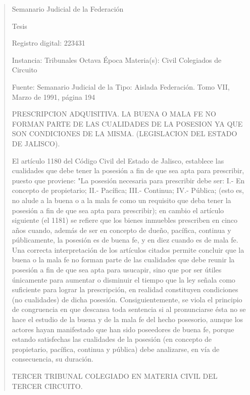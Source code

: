 \documentclass[11pt,a4paper]{article}
\begin{document}
\begin{quote}
                                                   Semanario Judicial de la Federación

                                                  Tesis

 Registro digital: 223431

 Instancia: Tribunales              Octava Época                            Materia(s): Civil
 Colegiados de Circuito

                                    Fuente: Semanario Judicial de la        Tipo: Aislada
                                    Federación.
                                    Tomo VII, Marzo de 1991, página
                                    194


PRESCRIPCION ADQUISITIVA. LA BUENA O MALA FE NO FORMAN PARTE DE LAS
CUALIDADES DE LA POSESION YA QUE SON CONDICIONES DE LA MISMA. (LEGISLACION
DEL ESTADO DE JALISCO).


El artículo 1180 del Código Civil del Estado de Jalisco, establece las cualidades que debe tener la
posesión a fin de que sea apta para prescribir, puesto que proviene: "La posesión necesaria para
prescribir debe ser: I.- En concepto de propietario; II.- Pacífica; III.- Continua; IV.- Pública; (esto es,
no alude a la buena o a la mala fe como un requisito que deba tener la posesión a fin de que sea
apta para prescribir); en cambio el artículo siguiente (el 1181) se refiere que los bienes inmuebles
prescriben en cinco años cuando, además de ser en concepto de dueño, pacífica, continua y
públicamente, la posesión es de buena fe, y en diez cuando es de mala fe. Una correcta
interpretación de los artículos citados permite concluir que la buena o la mala fe no forman parte de
las cualidades que debe reunir la posesión a fin de que sea apta para usucapir, sino que por ser
útiles únicamente para aumentar o disminuir el tiempo que la ley señala como suficiente para lograr
la prescripción, en realidad constituyen condiciones (no cualidades) de dicha posesión.
Consiguientemente, se viola el principio de congruencia en que descansa toda sentencia si al
pronunciarse ésta no se hace el estudio de la buena y de la mala fe del hecho posesorio, aunque
los actores hayan manifestado que han sido poseedores de buena fe, porque estando satisfechas
las cualidades de la posesión (en concepto de propietario, pacífica, continua y pública) debe
analizarse, en vía de consecuencia, su duración.

TERCER TRIBUNAL COLEGIADO EN MATERIA CIVIL DEL TERCER CIRCUITO.



\end{quote}
\end{document}
